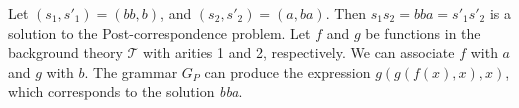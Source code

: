\begin{example}
Let $(s_1,s'_1)=(bb,b)$, and $(s_2,s'_2) = (a,ba)$. Then $s_1s_2 = bba = s'_1s'_2$ is a solution to the Post-correspondence problem. Let $f$ and $g$ be functions in the background theory $\mathcal{T}$ with arities 1 and 2, respectively. We can associate $f$ with $a$ and $g$ with $b$. 
The grammar $G_P$ can produce the expression $g(g(f(x),x),x)$, which corresponds to the solution \emph{bba}. 
\end{example}



